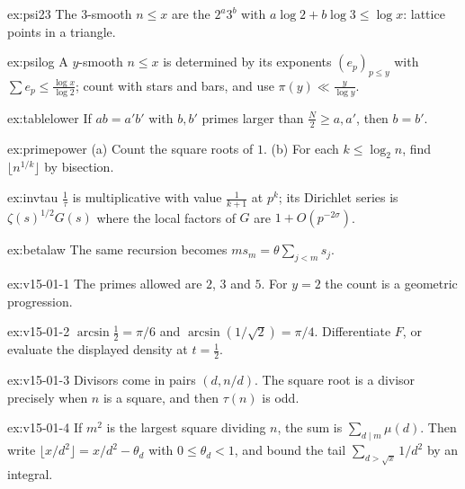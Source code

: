 \begin{hint}{ex:psi23}
The $3$-smooth $n\le x$ are the $2^a3^b$ with $a\log2+b\log3\le\log x$: lattice points in a triangle.
\end{hint}
\begin{hint}{ex:psilog}
A $y$-smooth $n\le x$ is determined by its exponents $(e_p)_{p\le y}$ with $\sum e_p\le\frac{\log x}{\log2}$; count with stars and bars, and use $\pi(y)\ll\frac y{\log y}$.
\end{hint}
\begin{hint}{ex:tablelower}
If $ab=a'b'$ with $b,b'$ primes larger than $\frac N2\ge a,a'$, then $b=b'$.
\end{hint}
\begin{hint}{ex:primepower}
(a) Count the square roots of $1$. (b) For each $k\le\log_2n$, find $\lfloor n^{1/k}\rfloor$ by bisection.
\end{hint}
\begin{hint}{ex:invtau}
$\frac1\tau$ is multiplicative with value $\frac1{k+1}$ at $p^k$; its Dirichlet series is $\zeta(s)^{1/2}G(s)$ where the local factors of $G$ are $1+O(p^{-2\sigma})$.
\end{hint}
\begin{hint}{ex:betalaw}
The same recursion becomes $ms_m=\theta\sum_{j<m}s_j$.
\end{hint}

\begin{hint}{ex:v15-01-1}
The primes allowed are \(2\), \(3\) and \(5\). For \(y=2\) the count is a geometric progression.
\end{hint}

\begin{hint}{ex:v15-01-2}
\(\arcsin\tfrac12=\pi/6\) and \(\arcsin(1/\sqrt2)=\pi/4\). Differentiate \(F\), or evaluate the displayed density at \(t=\tfrac12\).
\end{hint}

\begin{hint}{ex:v15-01-3}
Divisors come in pairs \((d,n/d)\). The square root is a divisor precisely when \(n\) is a square, and then \(\tau(n)\) is odd.
\end{hint}

\begin{hint}{ex:v15-01-4}
If \(m^2\) is the largest square dividing \(n\), the sum is \(\sum_{d\mid m}\mu(d)\). Then write \(\lfloor x/d^2\rfloor=x/d^2-\theta_d\) with \(0\le\theta_d<1\), and bound the tail \(\sum_{d>\sqrt x}1/d^2\) by an integral.
\end{hint}

